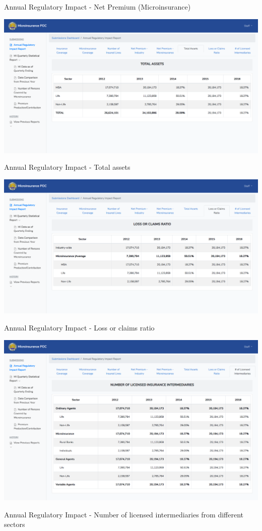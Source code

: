 \documentclass{article}
\begin{document}
Annual Regulatory Impact - Net Premium
(Microinsurance)%

\includegraphics[keepaspectratio=true]{up-ic-screens/image107}{}%

Annual Regulatory Impact - Total assets%

\includegraphics[keepaspectratio=true]{up-ic-screens/image15}{}%

Annual Regulatory Impact - Loss or claims ratio%

\includegraphics[keepaspectratio=true]{up-ic-screens/image192}{}%

Annual Regulatory Impact - Number of licensed
intermediaries from different sectors%
\end{document}
